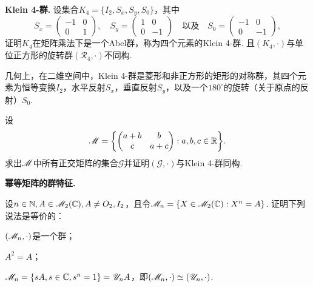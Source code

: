 \begin{mybox}
  \begin{problem}
  {\bfseries Klein 4-群.} 设集合$K_4=\{I_2,S_x,S_y,S_0\}$，其中
  \[
    S_x = \begin{pmatrix}
      -1 & 0 \\
      0 & 1
    \end{pmatrix},\quad
    S_y = \begin{pmatrix}
      1 & 0 \\
      0 & -1
    \end{pmatrix}\quad \text{以及}\quad
    S_0 = \begin{pmatrix}
      -1 & 0 \\
      0 & -1
    \end{pmatrix},
  \]
  证明$K_4$在矩阵乘法下是一个Abel群，称为四个元素的{\kaishu Klein 4-群}. 且$(K_4,\cdot)$与单位正方形的旋转群$(\mathscr R_4,\cdot)$不同构.
  \begin{nota}
    几何上，在二维空间中，Klein 4-群是菱形和非正方形的矩形的对称群，其四个元素为恒等变换$I_2$，水平反射$S_x$，垂直反射$S_y$，以及一个$180^\circ$的旋转（关于原点的反射）$S_0$.
  \end{nota}
  \end{problem}
\end{mybox}

\begin{problem}
  设
  \[
    \MM = \left\{
      \begin{pmatrix}
        a + b & b \\
        c & a + c
      \end{pmatrix}:a,b,c\in\MR
    \right\}.
  \]
  求出$\mathscr M$中所有正交矩阵的集合$\mathscr G$并证明$(\mathscr G,\cdot)$与Klein 4-群同构.
\end{problem}

\begin{problem}
  {\bfseries 幂等矩阵的群特征.}

  设$n\in\mathbb N,A\in\mathscr M_2(\mathbb C),A\ne O_2,I_2$，且令$\mathscr M_n=\{X\in\mathscr M_2(\mathbb C):X^n=A\}$. 证明下列说法是等价的：
  \begin{enum}
    \item\label{prob1.58.a} $(\mathscr M_n,\cdot)$是一个群；
    \item\label{prob1.58.b} $A^2=A$；
    \item\label{prob1.58.c} $\mathscr M_n=\{sA,s\in\mathbb C,s^n=1\}=\mathscr U_nA$，即$(\mathscr M_n,\cdot)\simeq(\mathscr U_n,\cdot)$.
  \end{enum}
\end{problem}

